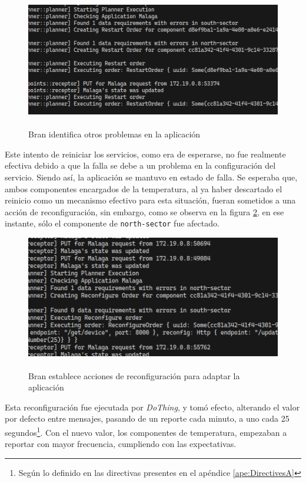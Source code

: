 \begin{figure}[H]
    \centering
    \caption{\\Bran identifica otros problemas en la aplicación}
    \label{fig:BranPlan2}
    \includegraphics[width=0.9\linewidth]{images/BranRestarting.png}
    \vspace{-4mm}
\end{figure}

Este intento de reiniciar los servicios, como era de esperarse, no fue realmente efectiva debido a que la falla se debe a un problema en la configuración del servicio. Siendo así, la aplicación se mantuvo en estado de falla. Se esperaba que, ambos componentes encargados de la temperatura, al ya haber descartado el reinicio como un mecanismo efectivo para esta situación, fueran sometidos a una acción de reconfiguración, sin embargo, como se observa en la figura \ref{fig:BranPlan3}, en ese instante, sólo el componente de \texttt{north-sector} fue afectado.

\begin{figure}[ht]
    \centering
    \caption{\\Bran establece acciones de reconfiguración para adaptar la aplicación}
    \label{fig:BranPlan3}
    \includegraphics[width=0.9\linewidth]{images/BranReconfiguring.png}
    \vspace{-4mm}
\end{figure}

Esta reconfiguración fue ejecutada por \textit{DoThing}, y tomó efecto, alterando el valor por defecto entre mensajes, pasando de un reporte cada minuto, a uno cada 25 segundos\footnote{Según lo definido en las directivas presentes en el apéndice \ref{ape:DirectivesA}}. Con el nuevo valor, los componentes de temperatura, empezaban a reportar con mayor frecuencia, cumpliendo con las expectativas.

